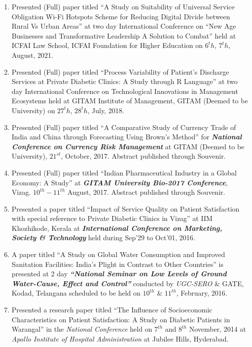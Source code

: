 \documentclass[10pt]{article}
\begin{document}
\begin{enumerate} 
\item Presented (Full) paper titled \enquote{A Study on Suitability of Universal Service Obligation Wi-Fi Hotspots Scheme for Reducing Digital Divide between Rural Vs Urban Areas} at two day International Conference on \enquote{New Age Businesses and Transformative Leadership A Solution to Combat} held at ICFAI Law School, ICFAI Foundation for Higher Education on $6^th$, $7^th$, August, 2021. 

\item Presented (Full) paper titled \enquote{Process Variability of Patient's Discharge Services at Private Diabetic Clinics: A Study through R Language} at two day International Conference on Technological Innovations in Management Ecosystems held at GITAM Institute of Management, GITAM (Deemed to be University) on $27^th$, $28^th$, July, 2018. 

\item Presented (Full) paper titled \enquote{A Comparative Study of Currency Trade of India and China through Forecasting Using Brown's Method} for \emph{\textbf{National Conference on Currency Risk Management}} at GITAM (Deemed to be University), $21^{st}$, October, 2017. Abstract published through Souvenir. 

\item Presented (Full) paper titled \enquote{Indian Pharmaceutical Industry in a Global Economy: A Study} at \emph{\textbf{GITAM University Bio-2017 Conference}}, Vizag. $10^{th} - 11^{th}$ August, 2017. Abstract published through Souvenir.

\item Presented a paper titled \enquote{Impact of Service Quality on Patient Satisfaction with special reference to Private Diabetic Clinics in Vizag} at IIM Khozhikode, Kerala at \emph{\textbf{International Conference on Marketing, Society \& Technology}} held during Sep'29 to Oct'01, 2016. 

\item A paper titled \enquote{A Study on Global Water Consumption and Improved Sanitation Facilities: India's Plight in Contrast to Other Countries} is presented at 2 day \textbf{\emph{\enquote{National Seminar on Low Levels of Ground Water-Cause, Effect and Control}}} conducted by \emph{UGC-SERO} \& GATE, Kodad, Telangana scheduled to be held on $10^{th}$ \& $11^{th}$, February, 2016. 

\item Presented a research paper titled \enquote{The Influence of Socioeconomic Characteristics on Patient Satisfaction: A Study on Diabetic Patients in Warangal} in the \textit{National Conference} held on $7^{th}$ and $8^{th}$ November, 2014 at \textit{Apollo Institute of Hospital Administration} at Jubilee Hills, Hyderabad. 


\end{enumerate}
\end{document}
